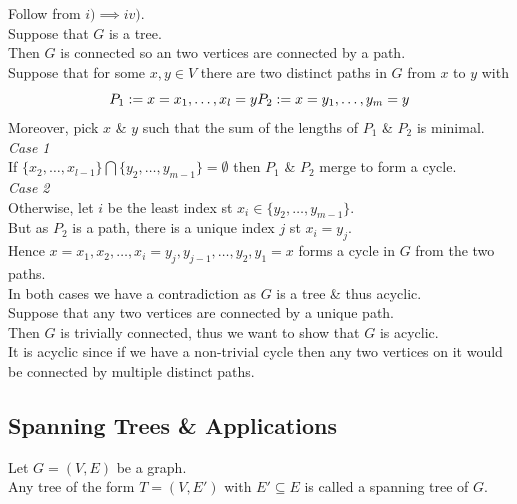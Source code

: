\documentclass[11pt,a4paper]{article}
\begin{document}
Follow from $i)\implies iv)$.\\

Suppose that $G$ is a tree.\\
Then $G$ is connected so an two vertices are connected by a path.\\
Suppose that for some $x,y\in V$ there are two distinct paths in $G$ from $x$ to $y$ with
$$P_1:=x=x_1,\dots,x_l=y\\P_2:=x=y_1,\dots,y_m=y$$
Moreover, pick $x$ \& $y$ such that the sum of the lengths of $P_1$ \& $P_2$ is minimal.\\
\textit{Case 1}\\
If $\{x_2,\dots,x_{l-1}\}\bigcap\{y_2,\dots,y_{m-1}\}=\emptyset$ then $P_1$ \& $P_2$ merge to form a cycle.\\
\textit{Case 2}\\
Otherwise, let $i$ be the least index st $x_i\in\{y_2,\dots,y_{m-1}\}$.\\
But as $P_2$ is a path, there is a unique index $j$ st $x_i=y_j$.\\
Hence $x=x_1,x_2,\dots,x_i=y_j,y_{j-1},\dots,y_2,y_1=x$ forms a cycle in $G$ from the two paths.\\
In both cases we have a contradiction as $G$ is a tree \& thus acyclic.\\

Suppose that any two vertices are connected by a unique path.\\
Then $G$ is trivially connected, thus we want to show that $G$ is acyclic.\\
It is acyclic since if we have a non-trivial cycle then any two vertices on it would be connected by multiple distinct paths.

\subsection{Spanning Trees \& Applications}

Let $G=(V,E)$ be a graph.\\
Any tree of the form $T=(V,E')$ with $E'\subseteq E$ is called a spanning tree of $G$.\\
\end{document}
